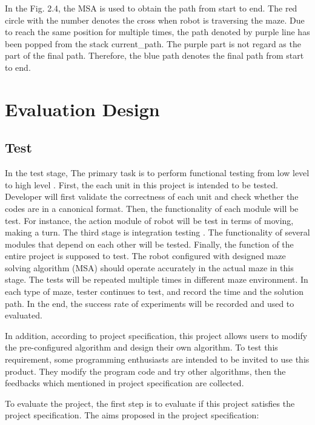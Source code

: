 \documentclass[11pt,times,oneside,openright,hardcopy]{eeereport}
\begin{document}

In the Fig. 2.4, the MSA is used to obtain the path from start to end. The red circle with the number denotes the cross when robot is traversing the maze.
Due to reach the same position for multiple times, the path denoted by purple line has been popped from the stack current\_path. The purple part is not regard as the part of the final path.
Therefore, the blue path denotes the final path from start to end.

\section{Evaluation Design}

\subsection{Test}
In the test stage, The primary task is to perform functional testing from low level to high level \cite{Reiman:2009ub}. 
First, the each unit in this project is intended to be tested. Developer will first validate the correctness of each unit and check whether the codes are in a canonical format. 
Then, the functionality of each module will be test. For instance, the action module of robot will be test in terms of moving, making a turn.
The third stage is integration testing \cite{Kandl:2014ug}. The functionality of several modules that depend on each other will be tested.
Finally, the function of the entire project is supposed to test. The robot configured with designed maze solving algorithm (MSA) should operate accurately in the actual maze in this stage.
The tests will be repeated multiple times in different maze environment. In each type of maze, tester continues to test, and record the time and the solution path.
In the end, the success rate of experiments will be recorded and used to evaluated.

In addition, according to project specification, this project allows users to modify the pre-configured algorithm and design their own algorithm. To test this requirement, some programming enthusiasts are intended to be invited to use this product.
They modify the program code and try other algorithms, then the feedbacks which mentioned in project specification are collected.

To evaluate the project, the first step is to evaluate if this project satisfies the project specification.
The aims proposed in the project specification:
\end{document}
